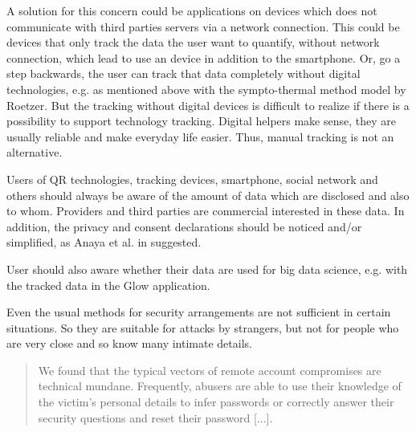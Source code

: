 A solution for this concern could be applications on devices which does not communicate with third parties servers via a network connection. This could be devices that only track the data the user want to quantify, without network connection, which lead to use an device in addition to the smartphone.
Or, go a step backwards, the user can track that data completely without digital technologies, e.g. as mentioned above with the sympto-thermal method model by Roetzer.
But the tracking without digital devices is difficult to realize if there is a possibility to support technology tracking. Digital helpers make sense, they are usually reliable and make everyday life easier. Thus, manual tracking is not an alternative.

Users of \acs{QR} technologies, tracking devices, smartphone, social network and others should always be aware of the amount of data which are disclosed and also to whom. Providers and third parties are commercial interested in these data. In addition, the privacy and consent declarations should be noticed and/or simplified, as Anaya et al. in \cite{anaya2018ethical} suggested.

User should also aware whether their data are used for big data science, e.g. with the tracked data in the Glow application.


Even the usual methods for security arrangements are not sufficient in certain situations. So they are suitable for attacks by strangers, but not for people who are very close and so know many intimate details.
\begin{quote}
	We found that the typical vectors of remote account compromises are technical mundane. Frequently, abusers are able to use their knowledge of the victim's personal details to infer passwords or correctly answer their security questions and reset their password [...]. \cite{freed2018stalker}
\end{quote}
